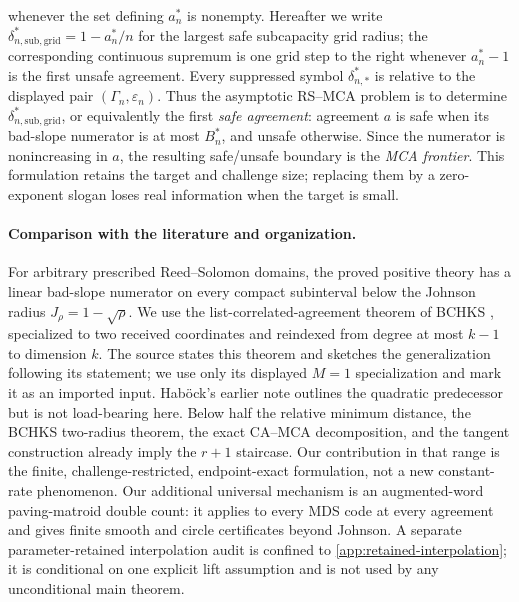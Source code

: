 \documentclass[11pt,a4paper]{amsart}
\numberwithin{equation}{section}
\theoremstyle{remark}
\newcommand{\eps}{\varepsilon}
\begin{document}
whenever the set defining \(a_n^*\) is nonempty.  Hereafter we write
\(\delta_{n,\mathrm{sub,grid}}^*=1-a_n^*/n\) for the largest safe
subcapacity grid radius; the corresponding continuous
supremum is one grid step to the right whenever \(a_n^*-1\) is the first
unsafe agreement.  Every suppressed symbol \(\delta_{n,*}^*\) is relative
to the displayed pair \((\Gamma_n,\eps_n)\).  Thus the asymptotic RS--MCA problem is to determine
\(\delta_{n,\mathrm{sub,grid}}^*\), or equivalently the first
\emph{safe agreement}: agreement \(a\) is safe when its bad-slope
numerator is at most \(B_n^*\), and unsafe otherwise.  Since the numerator
is nonincreasing in \(a\), the resulting safe/unsafe boundary is the
\emph{MCA frontier}.  This formulation retains the target and challenge
size; replacing them by a zero-exponent slogan loses real information when
the target is small.

\paragraph{Comparison with the literature and organization.}
For arbitrary prescribed Reed--Solomon domains, the proved positive theory
has a linear bad-slope numerator on every compact subinterval below the
Johnson radius \(J_\rho=1-\sqrt\rho\).  We use the list-correlated-agreement
theorem of BCHKS \cite[Thm.~4.6]{BCHKS25}, specialized to two received
coordinates and reindexed from degree at most \(k-1\) to dimension \(k\).
The source states this theorem and sketches the generalization following
its statement; we use only its displayed \(M=1\) specialization and mark it
as an imported input.
Hab\"ock's earlier note \cite{Habock25} outlines the quadratic predecessor
but is not load-bearing here.  Below half
the relative minimum distance, the BCHKS two-radius theorem, the exact
CA--MCA decomposition, and the tangent construction already imply the
\(r+1\) staircase.  Our contribution in that range is the finite,
challenge-restricted, endpoint-exact formulation, not a new constant-rate
phenomenon.  Our additional universal mechanism is an augmented-word
paving-matroid double count: it applies to every MDS code at every agreement
and gives finite smooth and circle certificates beyond Johnson.  A separate
parameter-retained interpolation audit is confined to
\cref{app:retained-interpolation}; it is conditional on one explicit lift
assumption and is not used by any unconditional main theorem.
\end{document}
